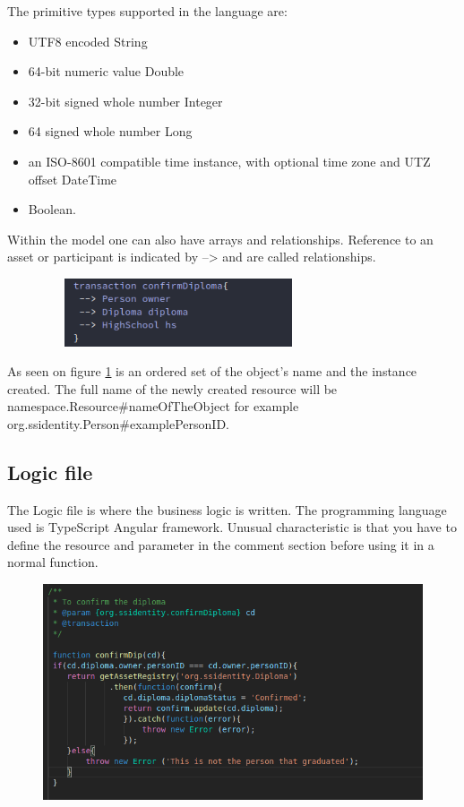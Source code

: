 \documentclass[a4paper,11pt]{report}
\begin{document}
The primitive types supported in the language are:
\begin{itemize}

\item UTF8 encoded String 
\item 64-bit numeric value Double 
\item 32-bit signed whole number Integer 
\item 64 signed whole number Long
\item an ISO-8601 compatible time instance, with optional time zone and UTZ offset DateTime 
\item Boolean. 

\end{itemize}
Within the model one can also have arrays and relationships. Reference to an asset or participant is indicated by --> and are called relationships.

\begin{figure}[h]
\centering
  \includegraphics[height = 2cm ,width = 8cm]{transaction.png}
  \label{transactionRelationship}
\end{figure}

As seen on figure \ref{transactionRelationship} is an ordered set of the object’s name and the instance created. The full name of the newly created resource will be namespace.Resource\#nameOfTheObject for example org.ssidentity.Person\#examplePersonID.

\subsection{Logic file}

The Logic file is where the business logic is written. The programming language used is TypeScript Angular framework. Unusual characteristic is that you have to define the resource and parameter in the comment section before using it in a normal function. 

\begin{figure}[h]
\centering
  \includegraphics[width = 12cm]{confirmdip.png}
  \label{transactionlogicfile}
\end{figure}
\end{document}
